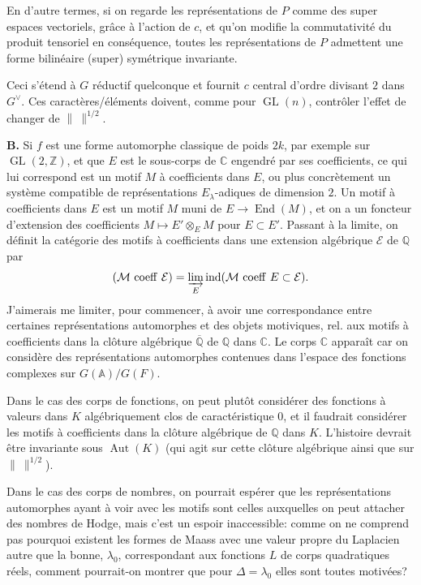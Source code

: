 \documentclass[11pt]{article}
\newcommand{\GL}{\operatorname{GL}}
\newcommand{\End}{\operatorname{End}}
\newcommand{\Aut}{\operatorname{Aut}}
\newcommand{\ind}{\operatorname{ind}}
\newcommand{\A}{\mathbb A}
\newcommand{\normchar}{\|\ \|}
\begin{document}
En d'autre termes, si on regarde les représentations de \(P\) comme des super espaces vectoriels, grâce à l'action de \(c\), et qu'on modifie la commutativité du produit tensoriel en conséquence, toutes les représentations de \(P\) admettent une forme bilinéaire (super) symétrique invariante.

Ceci s'étend à \(G\) réductif quelconque et fournit \(c\) central d'ordre divisant \(2\) dans \(G^\vee\). Ces caractères/éléments doivent, comme pour \(\GL(n)\), contrôler l'effet de changer de \(\normchar^{1/2}\).

\textbf{B.} Si \(f\) est une forme automorphe classique de poids \(2k\), par exemple sur \(\GL(2,\mathbb Z)\), et que \(E\) est le sous-corps de \(\mathbb C\) engendré par ses coefficients, ce qui lui correspond est un motif \(M\) à coefficients dans \(E\), ou plus concrètement un système compatible de représentations \(E_\lambda\)-adiques de dimension \(2\). Un motif à coefficients dans \(E\) est un motif \(M\) muni de \(E\to\End(M)\), et on a un foncteur d'extension des coefficients \(M\mapsto E'\otimes_E M\) pour \(E\subset E'\). Passant à la limite, on définit la catégorie des motifs à coefficients dans une extension algébrique \(\mathcal E\) de \(\mathbb Q\) par
\[
(\mathcal M\ \mathrm{coeff}\ \mathcal E)=\varinjlim_E \ind(\mathcal M\ \mathrm{coeff}\ E\subset\mathcal E).
\]
J'aimerais me limiter, pour commencer, à avoir une correspondance entre certaines représentations automorphes et des objets motiviques, rel. aux motifs à coefficients dans la clôture algébrique \(\overline{\mathbb Q}\) de \(\mathbb Q\) dans \(\mathbb C\). Le corps \(\mathbb C\) apparaît car on considère des représentations automorphes contenues dans l'espace des fonctions complexes sur \(G(\A)/G(F)\).

Dans le cas des corps de fonctions, on peut plutôt considérer des fonctions à valeurs dans \(K\) algébriquement clos de caractéristique \(0\), et il faudrait considérer les motifs à coefficients dans la clôture algébrique de \(\mathbb Q\) dans \(K\). L'histoire devrait être invariante sous \(\Aut(K)\) (qui agit sur cette clôture algébrique ainsi que sur \(\normchar^{1/2}\)).

Dans le cas des corps de nombres, on pourrait espérer que les représentations automorphes ayant à voir avec les motifs sont celles auxquelles on peut attacher des nombres de Hodge, mais c'est un espoir inaccessible: comme on ne comprend pas pourquoi existent les formes de Maass avec une valeur propre du Laplacien autre que la bonne, \(\lambda_0\), correspondant aux fonctions \(L\) de corps quadratiques réels, comment pourrait-on montrer que pour \(\Delta=\lambda_0\) elles sont toutes motivées?
\end{document}
